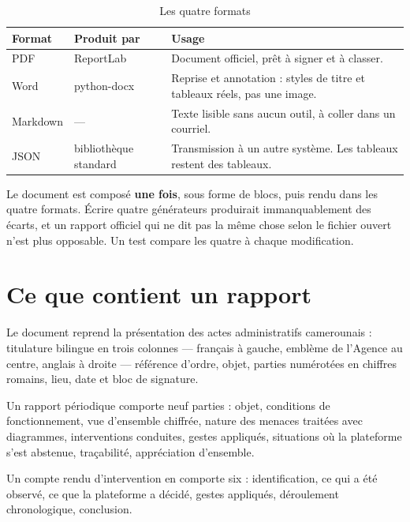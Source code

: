 \begin{table}[h]
\centering
\begin{tabular}{@{}p{2.4cm}p{4cm}p{7.4cm}@{}}
\toprule
\textbf{Format} & \textbf{Produit par} & \textbf{Usage} \\
\midrule
PDF & ReportLab &
Document officiel, prêt à signer et à classer. \\[6pt]
Word & python-docx &
Reprise et annotation : styles de titre et tableaux réels, pas une image. \\[6pt]
Markdown & --- &
Texte lisible sans aucun outil, à coller dans un courriel. \\[6pt]
JSON & bibliothèque standard &
Transmission à un autre système. Les tableaux restent des tableaux. \\
\bottomrule
\end{tabular}
\caption{Les quatre formats}
\end{table}

\begin{tcolorbox}[colback=green!4!white, colframe=darkgreen,
  title=\textbf{Bon à savoir --- les quatre versions disent la même chose},
  fonttitle=\bfseries, boxrule=0.6pt]
Le document est composé \textbf{une fois}, sous forme de blocs, puis rendu dans
les quatre formats. Écrire quatre générateurs produirait immanquablement des
écarts, et un rapport officiel qui ne dit pas la même chose selon le fichier
ouvert n'est plus opposable. Un test compare les quatre à chaque
modification.
\end{tcolorbox}

\section{Ce que contient un rapport}

Le document reprend la présentation des actes administratifs camerounais :
titulature bilingue en trois colonnes — français à gauche, emblème de l'Agence
au centre, anglais à droite — référence d'ordre, objet, parties numérotées en
chiffres romains, lieu, date et bloc de signature.

Un rapport périodique comporte neuf parties : objet, conditions de
fonctionnement, vue d'ensemble chiffrée, nature des menaces traitées avec
diagrammes, interventions conduites, gestes appliqués, situations où la
plateforme s'est abstenue, traçabilité, appréciation d'ensemble.

Un compte rendu d'intervention en comporte six : identification, ce qui a été
observé, ce que la plateforme a décidé, gestes appliqués, déroulement
chronologique, conclusion.

